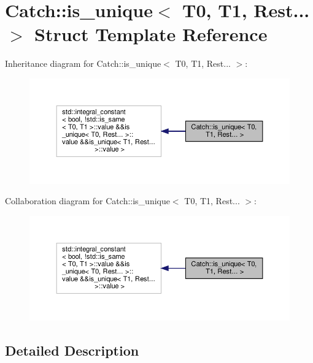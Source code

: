 \hypertarget{structCatch_1_1is__unique_3_01T0_00_01T1_00_01Rest_8_8_8_01_4}{}\section{Catch\+::is\+\_\+unique$<$ T0, T1, Rest... $>$ Struct Template Reference}
\label{structCatch_1_1is__unique_3_01T0_00_01T1_00_01Rest_8_8_8_01_4}


Inheritance diagram for Catch\+::is\+\_\+unique$<$ T0, T1, Rest... $>$\+:\nopagebreak
\begin{figure}[H]
\begin{center}
\leavevmode
\includegraphics[width=350pt]{structCatch_1_1is__unique_3_01T0_00_01T1_00_01Rest_8_8_8_01_4__inherit__graph}
\end{center}
\end{figure}


Collaboration diagram for Catch\+::is\+\_\+unique$<$ T0, T1, Rest... $>$\+:\nopagebreak
\begin{figure}[H]
\begin{center}
\leavevmode
\includegraphics[width=350pt]{structCatch_1_1is__unique_3_01T0_00_01T1_00_01Rest_8_8_8_01_4__coll__graph}
\end{center}
\end{figure}


\subsection{Detailed Description}
